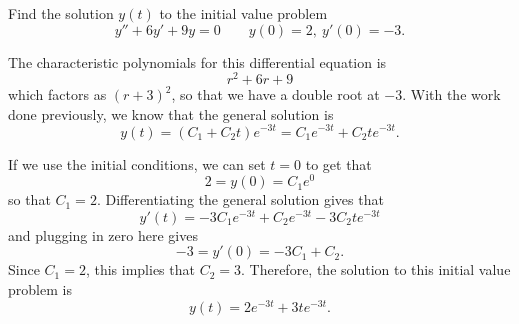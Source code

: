 \documentclass{ximera}
\begin{document}

\begin{example}
    Find the solution $y(t)$ to the initial value problem
    \begin{equation*}
        y'' + 6y' + 9y = 0 \qquad y(0) = 2,\ y'(0) = -3.
    \end{equation*}
\end{example}

\begin{exampleSol}
    The characteristic polynomials for this differential equation is 
    \begin{equation*}
        r^2 + 6r + 9
    \end{equation*}
    which factors as $(r+3)^2$, so that we have a double root at $-3$. With the work done previously, we know that the general solution is
    \begin{equation*}
        y(t) = (C_1 + C_2t)e^{-3t} = C_1e^{-3t} + C_2te^{-3t}.
    \end{equation*} 
    
    If we use the initial conditions, we can set $t=0$ to get that
    \begin{equation*}
        2 = y(0) = C_1 e^0
    \end{equation*}
    so that $C_1 = 2$. Differentiating the general solution gives that
    \begin{equation*}
        y'(t) = -3C_1e^{-3t} + C_2e^{-3t} -3C_2te^{-3t}
    \end{equation*}
    and plugging in zero here gives
    \begin{equation*}
        -3 = y'(0) = -3C_1 + C_2.
    \end{equation*}
    Since $C_1 = 2$, this implies that $C_2 = 3$. Therefore, the solution to this initial value problem is
    \begin{equation*}
        y(t) = 2e^{-3t} + 3te^{-3t}.
    \end{equation*}
\end{exampleSol}
\end{document}
